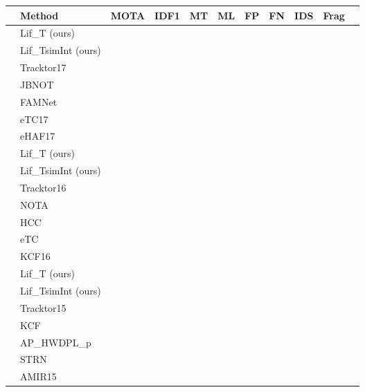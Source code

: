 \documentclass{article}
\begin{document}
\begin{table*}
\center

\small{

    \begin{tabular}{c l c c c c c c c c c}
     \toprule
     & Method  & MOTA  & IDF1  & MT  & ML  & FP & FN & IDS & Frag \\   
     \toprule
     \parbox[t]{3mm}{} &
 Lif\_T (ours) &   &&  &   &  &  & &   \\ 
 & Lif\_TsimInt (ours) &   &&  &   &  &  & &   \\ 
& Tracktor17&   &  &  &  &  &  &  &   \\ 
& JBNOT~ &   &  &  &  &  &  &  &   \\ 
& FAMNet&   &  &  &   &  &  &  &   \\ 
& eTC17&  &  &   &   &  &  &  &   \\ 
& eHAF17&   &  &   &   &  &  &  &   \\


     \midrule
     
     \parbox[t]{3mm}{} &
     Lif\_T (ours) &  &  &  &  &  &  &  &   \\ 
     & Lif\_TsimInt (ours) &   &&  &   &  &  & &   \\
& Tracktor16 &   &  &  &  &  &  &  &   \\ 
& NOTA &   &  &  &  &  &  &  &   \\ 
& HCC &   &  &  &  &  &  &  &   \\ 
& eTC&   &  &  &  &  &  &  &   \\ 
& KCF16  &   &  &  &  &  &  &  &   \\
     \midrule
     
     \parbox[t]{3mm}{} &
    Lif\_T (ours) &   &  &  &  &  &  &  &  \\ 
    & Lif\_TsimInt (ours) &   &  &  &  &  &  &  &  \\ 
& Tracktor15 & &  &  &  &  &  &  &   \\ 
& KCF  &  &  &  &  &  &  &  &   \\ 
& AP\_HWDPL\_p &   &  &  &   &  &  &  &   \\ 
& STRN &   &  &  &   &  &  &  &   \\ 
& AMIR15 &   &  &  &  &  &  &  &     \\
     \bottomrule
    \end{tabular}

}
\end{table*}
\end{document}
